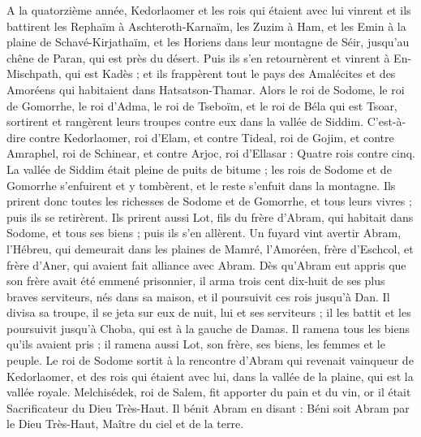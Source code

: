 \begin{multicols}{2}
A la quatorzième année, Kedorlaomer et les rois qui étaient avec lui vinrent et ils battirent les Rephaïm à Aschteroth-Karnaïm, les Zuzim à Ham, et les Emin à la plaine de Schavé-Kirjathaïm,
et les Horiens dans leur montagne de Séir, jusqu'au chêne de Paran, qui est près du désert.
Puis ils s’en retournèrent et vinrent à En-Mischpath, qui est Kadès ; et ils frappèrent tout le pays des Amalécites et des Amoréens qui habitaient dans Hatsatson-Thamar.
Alors le roi de Sodome, le roi de Gomorrhe, le roi d'Adma, le roi de Tseboïm, et le roi de Béla qui est Tsoar, sortirent et rangèrent leurs troupes contre eux dans la vallée de Siddim.
C'est-à-dire contre Kedorlaomer, roi d'Elam, et contre Tideal, roi de Gojim, et contre Amraphel, roi de Schinear, et contre Arjoc, roi d'Ellasar : Quatre rois contre cinq.
La vallée de Siddim était pleine de puits de bitume ; les rois de Sodome et de Gomorrhe s'enfuirent et y tombèrent, et le reste s'enfuit dans la montagne.
Ils prirent donc toutes les richesses de Sodome et de Gomorrhe, et tous leurs vivres ; puis ils se retirèrent.
Ils prirent aussi Lot, fils du frère d'Abram, qui habitait dans Sodome, et tous ses biens ; puis ils s'en allèrent.
Un fuyard vint avertir Abram, l’Hébreu, qui demeurait dans les plaines de Mamré, l’Amoréen, frère d'Eschcol, et frère d’Aner, qui avaient fait alliance avec Abram.
Dès qu’Abram eut appris que son frère avait été emmené prisonnier, il arma trois cent dix-huit de ses plus braves serviteurs, nés dans sa maison, et il poursuivit ces rois jusqu'à Dan.
Il divisa sa troupe, il se jeta sur eux de nuit, lui et ses serviteurs ; il les battit et les poursuivit jusqu'à Choba, qui est à la gauche de Damas.
Il ramena tous les biens qu'ils avaient pris ; il ramena aussi Lot, son frère, ses biens, les femmes et le peuple.
Le roi de Sodome sortit à la rencontre d’Abram qui revenait vainqueur de Kedorlaomer, et des rois qui étaient avec lui, dans la vallée de la plaine, qui est la vallée royale.
Melchisédek, roi de Salem, fit apporter du pain et du vin, or il était Sacrificateur du Dieu Très-Haut.
Il bénit Abram en disant : Béni soit Abram par le Dieu Très-Haut, Maître du ciel et de la terre.

\end{multicols}
